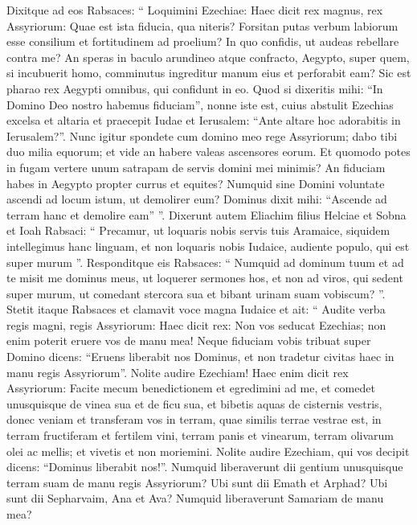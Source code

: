 \begin{biblechapter}
\begin{biblechapter}
\begin{biblechapter}
\begin{biblechapter}
\begin{biblechapter}
\begin{biblechapter}
\begin{biblechapter}
\begin{biblechapter}
\begin{biblechapter}
\begin{biblechapter}
\begin{biblechapter}
\begin{biblechapter}
\begin{biblechapter}
\begin{biblechapter}
\begin{biblechapter}
\begin{biblechapter}
\begin{biblechapter}
\begin{biblechapter}
 \verse Dixitque ad eos Rabsaces: “ Loquimini Ezechiae: Haec dicit rex magnus, rex Assyriorum: Quae est ista fiducia, qua niteris? 
\verse Forsitan putas verbum labiorum esse consilium et fortitudinem ad proelium? In quo confidis, ut audeas rebellare contra me? 
\verse An speras in baculo arundineo atque confracto, Aegypto, super quem, si incubuerit homo, comminutus ingreditur manum eius et perforabit eam? Sic est pharao rex Aegypti omnibus, qui confidunt in eo. 
\verse Quod si dixeritis mihi: “In Domino Deo nostro habemus fiduciam”, nonne iste est, cuius abstulit Ezechias excelsa et altaria et praecepit Iudae et Ierusalem: “Ante altare hoc adorabitis in Ierusalem?”. 
\verse Nunc igitur spondete cum domino meo rege Assyriorum; dabo tibi duo milia equorum; et vide an habere valeas ascensores eorum. 
\verse Et quomodo potes in fugam vertere unum satrapam de servis domini mei minimis? An fiduciam habes in Aegypto propter currus et equites? 
\verse Numquid sine Domini voluntate ascendi ad locum istum, ut demolirer eum? Dominus dixit mihi: “Ascende ad terram hanc et demolire eam” ”.
 \verse Dixerunt autem Eliachim filius Helciae et Sobna et Ioah Rabsaci: “ Precamur, ut loquaris nobis servis tuis Aramaice, siquidem intellegimus hanc linguam, et non loquaris nobis Iudaice, audiente populo, qui est super murum ”. 
\verse Responditque eis Rabsaces: “ Numquid ad dominum tuum et ad te misit me dominus meus, ut loquerer sermones hos, et non ad viros, qui sedent super murum, ut comedant stercora sua et bibant urinam suam vobiscum? ”.
 \verse Stetit itaque Rabsaces et clamavit voce magna Iudaice et ait: “ Audite verba regis magni, regis Assyriorum: 
\verse Haec dicit rex: Non vos seducat Ezechias; non enim poterit eruere vos de manu mea! 
\verse Neque fiduciam vobis tribuat super Domino dicens: “Eruens liberabit nos Dominus, et non tradetur civitas haec in manu regis Assyriorum”. 
\verse Nolite audire Ezechiam! Haec enim dicit rex Assyriorum: Facite mecum benedictionem et egredimini ad me, et comedet unusquisque de vinea sua et de ficu sua, et bibetis aquas de cisternis vestris, 
\verse donec veniam et transferam vos in terram, quae similis terrae vestrae est, in terram fructiferam et fertilem vini, terram panis et vinearum, terram olivarum olei ac mellis; et vivetis et non moriemini. Nolite audire Ezechiam, qui vos decipit dicens: “Dominus liberabit nos!”. 
\verse Numquid liberaverunt dii gentium unusquisque terram suam de manu regis Assyriorum? 
\verse Ubi sunt dii Emath et Arphad? Ubi sunt dii Sepharvaim, Ana et Ava? Numquid liberaverunt Samariam de manu mea? 

\end{biblechapter}
\end{biblechapter}
\end{biblechapter}
\end{biblechapter}
\end{biblechapter}
\end{biblechapter}
\end{biblechapter}
\end{biblechapter}
\end{biblechapter}
\end{biblechapter}
\end{biblechapter}
\end{biblechapter}
\end{biblechapter}
\end{biblechapter}
\end{biblechapter}
\end{biblechapter}
\end{biblechapter}
\end{biblechapter}
